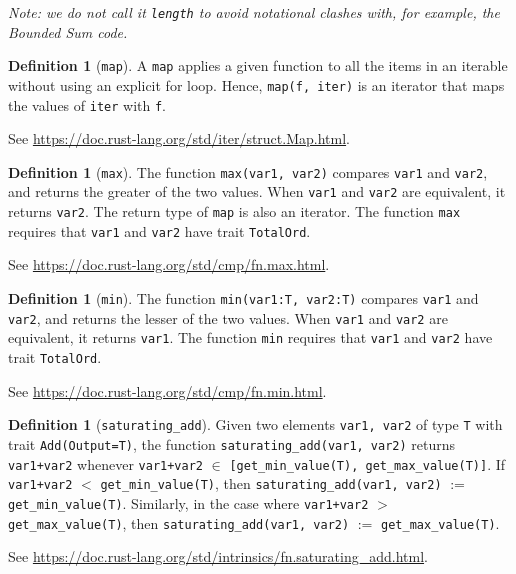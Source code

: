 \documentclass[11pt,a4paper]{article}
\theoremstyle{definition}
\newtheorem{definition}[theorem]{Definition}
\newcommand{\inRust}[2]{See \url{#2}.}
\begin{document}
\emph{Note: we do not call it \texttt{length} to avoid notational clashes with, for example, the Bounded Sum code.}

\begin{definition}[\texttt{map}]
    A \texttt{map} applies a given function to all the items in an iterable without using an explicit for loop. Hence, \texttt{map(f, iter)} is an iterator that maps the values of \texttt{iter} with \texttt{f}.
    
    \inRust{Struct std::iter::Map}{https://doc.rust-lang.org/std/iter/struct.Map.html}
\end{definition}

\begin{definition}[\texttt{max}]
    The function \texttt{max(var1, var2)} compares \texttt{var1} and \texttt{var2}, and returns the greater of the two values. When \texttt{var1} and \texttt{var2} are equivalent, it returns \texttt{var2}. The return type of \texttt{map} is also an iterator. The function \texttt{max} requires that \texttt{var1} and \texttt{var2} have trait \texttt{TotalOrd}. 
    
    \inRust{std::cmp::max}{https://doc.rust-lang.org/std/cmp/fn.max.html}
\end{definition}

\begin{definition}[\texttt{min}]
    The function \texttt{min(var1:T, var2:T)} compares \texttt{var1} and \texttt{var2}, and returns the lesser of the two values. When \texttt{var1} and \texttt{var2} are equivalent, it returns \texttt{var1}. The function \texttt{min} requires that \texttt{var1} and \texttt{var2} have trait \texttt{TotalOrd}. 
    
    \inRust{std::cmp::min}{https://doc.rust-lang.org/std/cmp/fn.min.html}
\end{definition}

\begin{definition}[\texttt{saturating\_add}]
    \label{defn:fn-saturating-add}
    Given two elements \texttt{var1, var2} of type \texttt{T} with trait \texttt{Add(Output=T)}, the function  \texttt{saturating\_add(var1, var2)} returns \texttt{var1+var2} whenever \texttt{var1+var2} $\in$ \texttt{[get\_min\_value(T), get\_max\_value(T)]}. If \texttt{var1+var2} $<$ \texttt{get\_min\_value(T)}, then \texttt{saturating\_add(var1, var2)} $:=$ \texttt{get\_min\_value(T)}. Similarly, in the case where \texttt{var1+var2} $>$ \texttt{get\_max\_value(T)}, then \texttt{saturating\_add(var1, var2)} $:=$ \texttt{get\_max\_value(T)}. 
    
    \inRust{std::intrinsics::saturating\_add}{https://doc.rust-lang.org/std/intrinsics/fn.saturating_add.html}
\end{definition}
\end{document}
